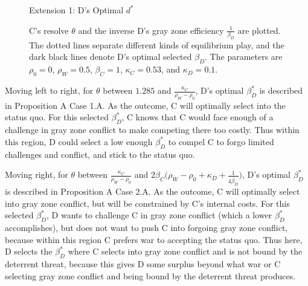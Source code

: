 \documentclass[
]{article}
\begin{document}
\begin{figure}
\caption{Extension 1: D's Optimal $d^{*}$}
\caption*{C's resolve $\theta$ and the inverse D's gray zone efficiency $\frac{1}{\beta_{D}}$ are plotted. The dotted lines separate different kinds of equilibrium play, and the dark black lines denote D's optimal selected $\beta_{D}$. The parameters are $\rho_{0}=0$, $\rho_{W}=0.5$, $\beta_{C}=1$, $\kappa_{C}=0.53$, and $\kappa_{D}=0.1$.}
\end{figure}

Moving left to right, for \(\theta\) between \(1.285\) and \(\frac{\kappa_{C}}{\rho_{W}-\rho_{0}}\), D's optimal \(\beta_{D}^{*}\) is described in Proposition A Case 1.A. As the outcome, C will optimally select into the status quo. For this selected \(\beta_{D}^{*}\), C knows that C would face enough of a challenge in gray zone conflict to make competing there too costly. Thus within this region, D could select a low enough \(\beta_{D}^{*}\) to compel C to forgo limited challenges and conflict, and stick to the status quo.

Moving right, for \(\theta\) between \(\frac{\kappa_{C}}{\rho_{W}-\rho_{0}}\) and \(\ensuremath{2\beta_{C}(\rho_{W}-\ensuremath{\rho_{0}}+\kappa_{D}}+\frac{1}{4\check{\beta_{D}}})\), D's optimal \(\beta_{D}^{*}\) is described in Proposition A Case 2.A. As the outcome, C will optimally select into gray zone conflict, but will be constrained by C's internal costs. For this selected \(\beta_{D}^{*}\), D wants to challenge C in gray zone conflict (which a lower \(\beta_{D}^{*}\) accomplishes), but does not want to push C into forgoing gray zone conflict, because within this region C prefers war to accepting the status quo. Thus here, D selects the \(\beta_{D}^{*}\) where C selects into gray zone conflict and is not bound by the deterrent threat, because this gives D some surplus beyond what war or C selecting gray zone conflict and being bound by the deterrent threat produces.
\end{document}
